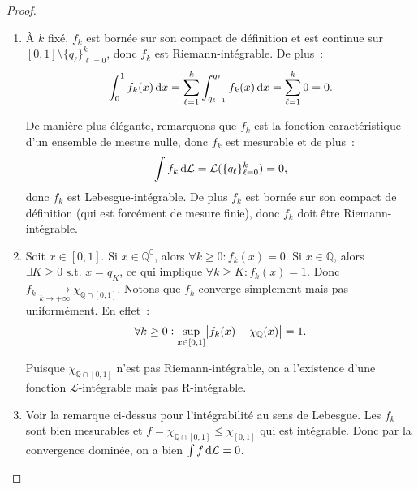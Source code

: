 \documentclass{article}
\newcommand{\pinfty}{{+\infty}}
\newcommand{\st}{\text{ s.t. }}
\newcommand{\C}{\complement}
\newcommand{\Q}{{\mathbb Q}}
\begin{document}
\begin{proof}~
\begin{enumerate}
	\item À $k$ fixé, $f_k$ est bornée sur son compact de définition et est continue sur $[0, 1] \setminus \{q_\ell\}_{\ell=0}^k$, donc $f_k$ est Riemann-intégrable. De plus~:
	\[\int_0^1f_k(x)\dif x = \sum_{\ell=1}^k\int_{q_{\ell-1}}^{q_\ell}f_k(x)\dif x = \sum_{\ell=1}^k0 = 0.\]

	De manière plus élégante, remarquons que $f_k$ est la fonction caractéristique d'un ensemble de mesure nulle, donc $f_k$ est mesurable et de plus~:
	\[\int f_k\dif\mathcal L = \mathcal L(\{q_\ell\}_{\ell=0}^k) = 0,\]
	donc $f_k$ est Lebesgue-intégrable. De plus $f_k$ est bornée sur son compact de définition (qui est forcément de mesure finie), donc $f_k$ doit être Riemann-intégrable.

	\item Soit $x \in [0, 1]$. Si $x \in \Q^\C$, alors $\forall k \geq 0 : f_k(x) = 0$. Si $x \in \Q$, alors $\exists K \geq 0 \st x = q_K$, ce qui implique
	$\forall k \geq K : f_k(x) = 1$. Donc $f_k \xrightarrow[k \to \pinfty]{} \chi_{\Q \cap [0, 1]}$. Notons que $f_k$ converge simplement mais pas uniformément. En effet~:
	\[\forall k \geq 0 : \sup_{x \in [0, 1]}\abs {f_k(x)-\chi_\Q(x)} = 1.\]

	Puisque $\chi_{\Q \cap [0, 1]}$ n'est pas Riemann-intégrable, on a l'existence d'une fonction $\mathcal L$-intégrable mais pas R-intégrable.

	\item Voir la remarque ci-dessus pour l'intégrabilité au sens de Lebesgue. Les $f_k$ sont bien mesurables et $f = \chi_{\Q \cap [0, 1]} \leq \chi_{[0, 1]}$ qui est intégrable.
	Donc par la convergence dominée, on a bien $\int f\dif\mathcal L = 0$.
\end{enumerate}
\end{proof}

\newpage
\end{document}
